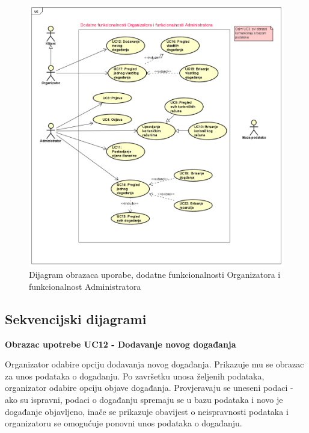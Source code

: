 	\begin{figure}[H]
		\includegraphics[scale=0.5]{dijagrami/uc2.PNG}
		\centering
		\caption{Dijagram obrazaca uporabe, dodatne funkcionalnosti Organizatora i funkcionalnost Administratora}
		\label{fig:promjene}
	\end{figure}
	
	\newpage
	
	\subsection{Sekvencijski dijagrami}
	
	\noindent \textbf{Obrazac upotrebe UC12 - Dodavanje novog događanja}
	
	\noindent Organizator odabire opciju dodavanja novog događanja. Prikazuje mu se obrazac za unos podataka o događanju. Po završetku unosa željenih podataka, organizator odabire opciju objave događanja. Provjeravaju se uneseni podaci - ako su ispravni, podaci o događanju spremaju se u bazu podataka i novo je događanje objavljeno, inače se prikazuje obavijest o neispravnosti podataka i organizatoru se omogućuje ponovni unos podataka o događanju. 
	
